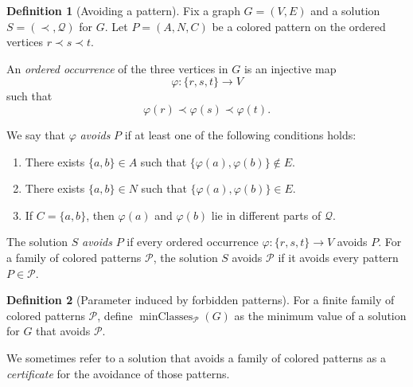 \documentclass[11pt]{article}
\newcommand{\minClases}{\operatorname{minClasses}}
\theoremstyle{definition}
\newtheorem{definition}{Definition}[section]
\theoremstyle{plain}
\theoremstyle{remark}
\begin{document}
\begin{definition}[Avoiding a pattern]
Fix a graph \(G=(V,E)\) and a solution \(S=(\prec,\mathcal Q)\) for \(G\).
Let \(P=(A,N,C)\) be a colored pattern on the ordered vertices \(r\prec s\prec t\).

An \emph{ordered occurrence} of the three vertices in \(G\) is an injective map
\[
\varphi:\{r,s,t\}\to V
\]
such that
\[
\varphi(r)\prec \varphi(s)\prec \varphi(t).
\]

We say that \(\varphi\) \emph{avoids} \(P\) if at least one of the following conditions holds:
\begin{enumerate}
\item There exists \(\{a,b\}\in A\) such that \(\{\varphi(a),\varphi(b)\}\notin E\).
\item There exists \(\{a,b\}\in N\) such that \(\{\varphi(a),\varphi(b)\}\in E\).
\item If \(C=\{a,b\}\), then \(\varphi(a)\) and \(\varphi(b)\) lie in different parts of \(\mathcal Q\).
\end{enumerate}

The solution \(S\) \emph{avoids} \(P\) if every ordered occurrence \(\varphi:\{r,s,t\}\to V\) avoids \(P\).
For a family of colored patterns \(\mathcal P\), the solution \(S\) avoids \(\mathcal P\) if it avoids every pattern
\(P\in\mathcal P\).
\end{definition}

\begin{definition}[Parameter induced by forbidden patterns]
For a finite family of colored patterns \(\mathcal P\), define \(\minClases_{\mathcal P}(G)\) as the minimum value
of a solution for \(G\) that avoids \(\mathcal P\).
\end{definition}

We sometimes refer to a solution that avoids a family of colored patterns as a \emph{certificate} for the avoidance of those patterns.


\end{document}
